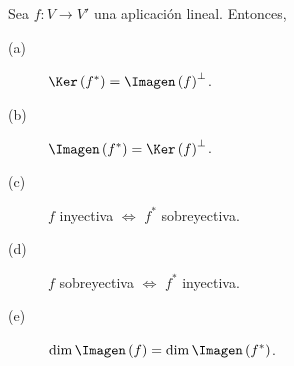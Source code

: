 \begin{ftheorem}[]
\normalfont Sea $\displaystyle f: V \to V' $ una aplicación lineal. Entonces,
\begin{description}
\item[(a)] $\displaystyle \Ker\left(f^{*}\right) = \Imagen\left(f\right)^{\perp } $.
\item[(b)] $\displaystyle \Imagen\left(f^{*}\right) = \Ker\left(f\right)^{\perp } $.
\item[(c)] $\displaystyle f $ inyectiva $\displaystyle \iff  $ $\displaystyle f^{*} $ sobreyectiva.
\item[(d)] $\displaystyle f $ sobreyectiva $\displaystyle \iff  $ $\displaystyle f^{*} $ inyectiva.
\item[(e)] $\displaystyle \dim \Imagen\left(f\right) = \dim \Imagen\left(f^{*}\right) $.
\end{description}
\end{ftheorem}

